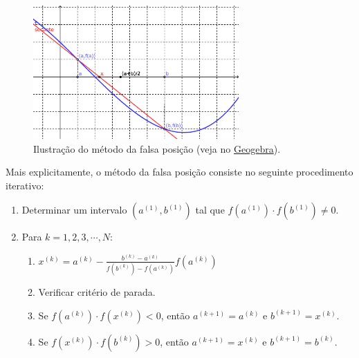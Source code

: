 \begin{figure}[h!]
  \centering
  \includegraphics[width=0.7\textwidth]{./cap_eq1d/dados/fig_falsapos/fig_falsapos}
  \caption{Ilustração do método da falsa posição (veja no \href{https://github.com/phkonzen/notas/blob/master/src/MatematicaNumerica/cap_eq1d/dados/fig_falsapos/fig_falsapos.ggb}{Geogebra}).}
  \label{fig:falsapos}
\end{figure}

Mais explicitamente, o método da falsa posição consiste no seguinte procedimento iterativo:
\begin{enumerate}
\item Determinar um intervalo $(a^{(1)}, b^{(1)})$ tal que $f(a^{(1)})\cdot f(b^{(1)}) \neq 0$.
\item Para $k = 1, 2, 3, \cdots, N$:
  \begin{enumerate}[2.1]
  \item $\displaystyle x^{(k)} = a^{(k)} - \frac{b^{(k)}-a^{(k)}}{f(b^{(k)})-f(a^{(k)})}f(a^{(k)})$
  \item Verificar critério de parada.
  \item Se $f(a^{(k)})\cdot f(x^{(k)}) < 0$, então $a^{(k+1)}=a^{(k)}$ e $b^{(k+1)}=x^{(k)}$.
  \item Se $f(x^{(k)})\cdot f(b^{(k)}) > 0$, então $a^{(k+1)}=x^{(k)}$ e $b^{(k+1)}=b^{(k)}$.
  \end{enumerate}
\end{enumerate}

